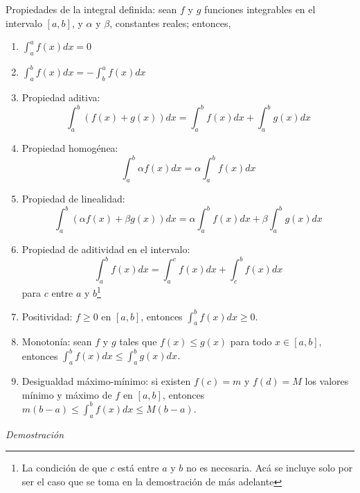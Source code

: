 \begin{teorema}\label{PropIntegral}
 \textnormal{Propiedades de la integral definida: sean \textit{$f$} y \textit{$g$} funciones integrables en el intervalo \textit{$[a,b]$}, y \textit{$\alpha$} y \textit{$\beta$}, constantes reales; entonces,}
\renewcommand{\labelenumi}{\normalfont\theenumi.}
 \begin{enumerate}[leftmargin=1.2em, itemindent=0pt,       labelwidth=\labelwidth,labelsep=0.5em,]


 \item $\displaystyle\int_{a}^{a}f\left( x\right) dx=0$
 
 
 \item $\displaystyle\int_{a}^{b}f\left( x\right) dx=-\int_{b}^{a}f\left( x\right) dx$
 
 
 \item \textnormal{Propiedad aditiva:}
 \[
 \int_{a}^{b}\left( f(x)+g(x)\right)dx=\int_{a}^{b}f(x)dx+\int_{a}^{b}g(x)dx
 \]

 \item \textnormal{Propiedad homogénea:} \[\int_{a}^{b}\alpha f(x)dx=\alpha \int_{a}^{b}f(x)dx\]
 \item \textnormal{Propiedad de linealidad:} \[\int_{a}^{b}\left( \alpha f(x)+\beta g(x)\right) dx=\alpha \int_{a}^{b}f(x)dx+\beta \int_{a}^{b}g(x)dx\]
 \item \textnormal{Propiedad de aditividad en el intervalo:} \[\int_{a}^{b}f(x)dx=\int_{a}^{c}f(x)dx+\int_{c}^{b}f(x)dx\] \textnormal{para \textit{$c$} entre \textit{$a$} y \textit{$b$}}\footnote{La condición de que $c$ está entre $a$ y $b$ no es necesaria. Acá se incluye solo por ser el caso que se toma en la demostración de más adelante}
 \item \textnormal{Positividad:} $f\geq 0$ en $[a,b]$, entonces $\int_{a}^{b}f(x)dx\geq 0$.
 \item \textnormal{Monotonía: sean \textit{$f$} y \textit{$g$} tales que \textit{$f\left( x\right)\leq g\left( x\right) $} para todo \textit{$x\in \left[ a,b\right],$} entonces \textit{$\int_{a}^{b}f(x)dx\leq \int_{a}^{b}g(x)dx$.}}
 \item \textnormal{Desigualdad máximo-mínimo: si existen \textit{$f(c)=m $} y \textit{$f(d)=M$} los valores mínimo y máximo de \textit{$f$} en \textit{$[a,b]$}, entonces \textit{$m(b-a)\leq \int_{a}^{b}f(x)dx\leq M(b-a).$}}
 \end{enumerate}
\end{teorema}
\clearpage
\textit{Demostración}
